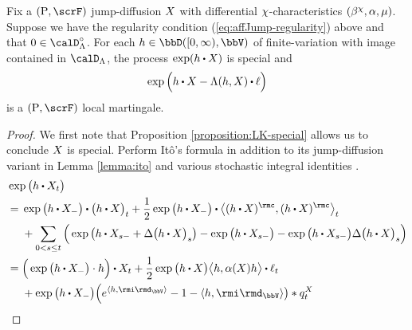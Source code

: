 \begin{theorem}
  \label{theorem:LD-exponential-martingale}
  Fix a $(\Prb, \scrF)$ jump-diffusion $X$ with differential $\chi$-characteristics $(\beta^\chi, \alpha, \mu)$.
  Suppose we have the regularity condition (\ref{eq:affJump-regularity}) above and that $0 \in \odeSpace^\circ$.
  For each $\twistFunc \in \pathSpace{[0,\infty)}{\vecSpace}$ of finite-variation with image contained in $\odeSpace$, the process $\exp(\twistFunc \shortInt \X)$ is special and 
  \[
    \exp\Big(\twistFunc \shortInt \X - \ode(\twistFunc, \X) \shortInt \leb\Big)
  \]
  is a $(\Prb, \scrF)$ local martingale.
\end{theorem}
\begin{proof}
  \label{proof:theorem:LD-exponential-martingale}
  We first note that Proposition \ref{proposition:LK-special} allows us to conclude $X$ is special.
  Perform It\^o's formula \cite[Theoerem I.4.57]{jacod2003} in addition to its jump-diffusion variant in Lemma \ref{lemma:ito} and various stochastic integral identities \cite[Remarks I.4.36, I.4.37, Theorem I.4.40(d), Proposition II.1.30(b)]{jacod2003}.
  \begin{align}
    \notag
    &\exp\big( \twistFunc \shortInt \X_t \big) \\
    \notag
    &= \begin{aligned}[t]
      &\exp\big( \twistFunc \shortInt \X_- \big) \shortInt \big( \twistFunc \shortInt \X \big)_t + \frac12 \exp\big( \twistFunc \shortInt \X_- \big) \shortInt \bprj{(\twistFunc\shortInt \X)^\rmc}{(\twistFunc\shortInt\X)^\rmc}_t \\
      &+ \sum_{0<s\leq t} \Big( \exp\big(\twistFunc \shortInt \X_{s-} + \Delta\big(\twistFunc \shortInt \X\big)_s \big) - \exp\big(\twistFunc\shortInt \X_{s-}\big) - \exp\big(\twistFunc \shortInt\X_{s-}\big) \Delta \big(\twistFunc \shortInt \X\big)_s\Big)
    \end{aligned} \\
    \notag
    &= \begin{aligned}[t]
      &\Big(\exp\big( \twistFunc \shortInt \X_- \big) \cdot \twistFunc \Big) \shortInt \X_t + \frac12 \exp\big( \twistFunc \shortInt \X \big) \bprj{\twistFunc}{\affDiff(\X)\twistFunc} \shortInt \leb_t \\
      &+ \exp\big(\twistFunc\shortInt\X_-\big) \Big( e^{\prj{\twistFunc}{\id_\vecSpace}} - 1 - \prj{\twistFunc}{\id_\vecSpace} \big) \ast \jumpMeas^\X_t
    \end{aligned} \\

\end{align}
\end{proof}
